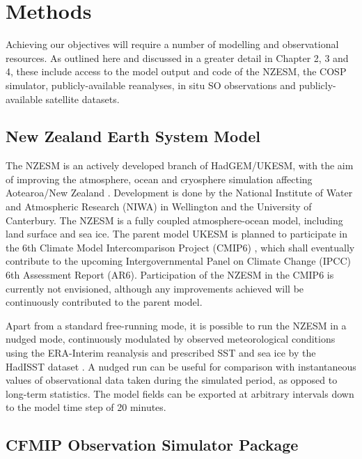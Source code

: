 \section{Methods}

Achieving our objectives will require a number of modelling and
observational resources. As outlined here and discussed in
a greater detail in Chapter 2, 3 and 4, these include access to the model output
and
code of the NZESM, the COSP simulator, publicly-available reanalyses,
 in situ SO observations and publicly-available
satellite datasets.

\subsection{New Zealand Earth System Model}

The NZESM is an actively developed branch of HadGEM/UKESM, with the
aim of improving the atmosphere, ocean and cryosphere simulation affecting
Aotearoa/New Zealand
\citep{williams2016}. Development is done by the National Institute of Water and
Atmospheric Research (NIWA) in Wellington and the University of Canterbury.
The NZESM is a fully coupled atmosphere-ocean model, including land surface
and sea ice. The parent model UKESM \citep{walters2017} is planned to participate
in the 6th Climate Model Intercomparison Project (CMIP6) \citep{eyring2016,meehl2014},
which shall eventually contribute to the upcoming
Intergovernmental Panel on Climate Change (IPCC) 6th
Assessment Report (AR6). Participation of the NZESM in the CMIP6 is currently not
envisioned, although any improvements achieved will be continuously contributed
to the parent model.

Apart from a standard free-running mode, it is possible to run the NZESM
in a nudged mode, continuously modulated by observed meteorological
conditions using the ERA-Interim reanalysis \citep{dee2011} and prescribed SST and sea ice
by the HadISST dataset \citep{rayner2003}.
A nudged run can be useful for comparison with instantaneous values of
observational data taken during the simulated period,
as opposed to long-term statistics. The model fields can be exported
at arbitrary intervals down to the model time step of 20 minutes.

\subsection{CFMIP Observation Simulator Package}

